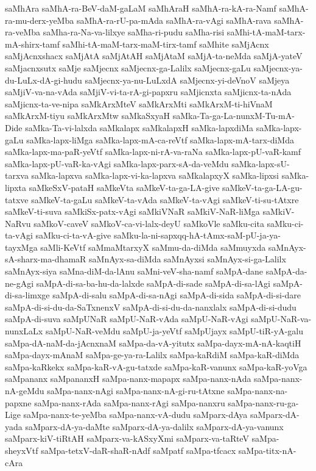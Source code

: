 {saMhAra
saMhA-ra-BeV-daM-gaLaM
saMhAraH
saMhA-ra-kA-ra-Namf
saMhA-ra-mu-derx-yeMba
saMhA-ra-rU-pa-mAda
saMhA-ra-vAgi
saMhA-rava
saMhA-ra-veMba
saMha-ra-Na-va-lilxye
saMha-ri-pudu
saMha-risi
saMhi-tA-maM-tarx-mA-shirx-tamf
saMhi-tA-maM-tarx-maM-tirx-tamf
saMhite
saMjAcnx
saMjAcnxshacx
saMjAtA
saMjAtAH
saMjAtaM
saMjA-ta-neMda
saMjA-yateV
saMjacnxsutx
saMje
saMjecnx
saMjecnx-ga-Lalilx
saMjecnx-gaLu
saMjecnx-ya-du-LuLx-dA-gi-hudu
saMjecnx-ya-nu-LuLxdA
saMjecnx-yi-deVnoV
saMjeya
saMjiV-va-na-vAda
saMjiV-vi-ta-rA-gi-papxru
saMjicnxta
saMjicnx-ta-nAda
saMjicnx-ta-ve-nipa
saMkArxMteV
saMkArxMti
saMkArxM-ti-hiVnaM
saMkArxM-tiyu
saMkArxMtw
saMkaSxyaH
saMka-Ta-ga-La-nunxM-Tu-mA-Dide
saMka-Ta-vi-lalxda
saMkalapx
saMkalapxH
saMka-lapxdiMa
saMka-lapx-gaLu
saMka-lapx-liMga
saMka-lapx-mA-ca-reVtf
saMka-lapx-mA-tarx-diMda
saMka-lapx-ma-paR-yeVtf
saMka-lapx-ni-rA-va-raNa
saMka-lapx-pU-vaR-kamf
saMka-lapx-pU-vaR-ka-vAgi
saMka-lapx-parx-sA-da-veMdu
saMka-lapx-sU-tarxva
saMka-lapxva
saMka-lapx-vi-ka-lapxva
saMkalapxyX
saMka-lipxsi
saMka-lipxta
saMkeSxV-pataH
saMkeVta
saMkeV-ta-ga-LA-give
saMkeV-ta-ga-LA-gu-tatxve
saMkeV-ta-gaLu
saMkeV-ta-vAda
saMkeV-ta-vAgi
saMkeV-ti-su-tAtxre
saMkeV-ti-suva
saMkiSx-patx-vAgi
saMkiVNaR
saMkiV-NaR-liMga
saMkiV-NaRvu
saMkoV-caveV
saMkoV-ca-vi-lalx-deyU
saMkoVle
saMku-cita
saMku-ci-ta-vAgi
saMku-ci-ta-vA-give
saMku-la-ni-sapxqq-hA-tAmx-saM-pU-ja-ya-tayxMga
saMli-KeVtf
saMmaMtarxyX
saMmu-da-diMda
saMmuyxda
saMnAyx-sA-sharx-ma-dhamaR
saMnAyx-sa-diMda
saMnAyxsi
saMnAyx-si-ga-Lalilx
saMnAyx-siya
saMna-diM-da-lAnu
saMni-veV-sha-namf
saMpA-dane
saMpA-da-ne-gAgi
saMpA-di-sa-ba-hu-da-lalxde
saMpA-di-sade
saMpA-di-sa-lAgi
saMpA-di-sa-limxge
saMpA-di-salu
saMpA-di-sa-nAgi
saMpA-di-sida
saMpA-di-si-dare
saMpA-di-si-du-da-SaTxnenxV
saMpA-di-si-du-da-nanxlalx
saMpA-di-si-dudu
saMpA-di-suva
saMpUNaR
saMpU-NaR-vAda
saMpU-NaR-vAgi
saMpU-NaR-va-nunxLaLx
saMpU-NaR-veMdu
saMpU-ja-yeVtf
saMpUjayx
saMpU-tiR-yA-galu
saMpa-dA-naM-da-jAcnxnaM
saMpa-da-vA-yitutx
saMpa-dayx-mA-nA-kaqtiH
saMpa-dayx-mAnaM
saMpa-ge-ya-ra-Lalilx
saMpa-kaRdiM
saMpa-kaR-diMda
saMpa-kaRkekx
saMpa-kaR-vA-gu-tatxde
saMpa-kaR-vanunx
saMpa-kaR-yoVga
saMpananx
saMpananxH
saMpa-nanx-mapapx
saMpa-nanx-nAda
saMpa-nanx-nA-geMdu
saMpa-nanx-nAgi
saMpa-nanx-nA-gi-ru-tAtxne
saMpa-nanx-na-papxne
saMpa-nanx-rAda
saMpa-nanx-rAgi
saMpa-nanxru
saMpa-nanx-ru-ga-Lige
saMpa-nanx-te-yeMba
saMpa-nanx-vA-dudu
saMparx-dAya
saMparx-dA-yada
saMparx-dA-ya-daMte
saMparx-dA-ya-dalilx
saMparx-dA-ya-vanunx
saMparx-kiV-tiRtAH
saMparx-va-kASxyXmi
saMparx-va-taRteV
saMpa-sheyxVtf
saMpa-tetxV-daR-shaR-nAdf
saMpatf
saMpa-tfcacx
saMpa-titx-nA-cAra
}
